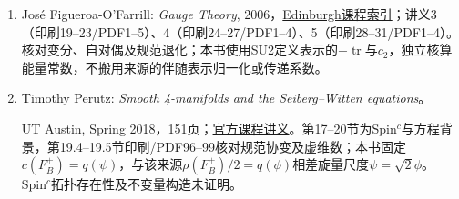 \begin{enumerate}
\item Jos\'e Figueroa-O'Farrill: \textit{Gauge Theory}, 2006，\href{https://webhomes.maths.ed.ac.uk/~jmf/Teaching/GT/index.html}{Edinburgh课程索引}；讲义3（印刷19--23/PDF1--5）、4（印刷24--27/PDF1--4）、5（印刷28--31/PDF1--4）。核对变分、自对偶及规范退化；本书使用SU2定义表示的$-\operatorname{tr}$与$c_2$，独立核算能量常数，不搬用来源的伴随表示归一化或传递系数。
\item Timothy Perutz: \textit{Smooth 4-manifolds and the Seiberg--Witten equations}。\par
UT Austin, Spring 2018，151页；\href{https://web.ma.utexas.edu/users/perutz/GaugeTheory/FullCourse.pdf}{官方课程讲义}。第17--20节为Spin$^c$与方程背景，第19.4--19.5节印刷/PDF96--99核对规范协变及虚维数；本书固定$c(F_B^+)=q(\psi)$，与该来源$\rho(F_B^+)/2=q(\phi)$相差旋量尺度$\psi=\sqrt2\phi$。Spin$^c$拓扑存在性及不变量构造未证明。
\end{enumerate}
